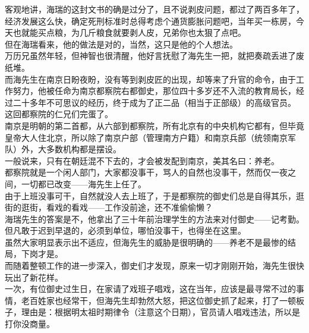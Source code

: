 \begin{multicols}{\theparacolNo}
客观地讲，海瑞的这封文书的确是过分了，且不说剥皮问题，都过了两百多年了，经济发展这么快，确定死刑标准时总得考虑个通货膨胀问题吧，当年买一栋房，今天也就能买点粮，为几斤粮食就要剥人皮，兄弟你也太狠了点吧。\\

但在海瑞看来，他的做法是对的，当然，这只是他的个人想法。\\

万历兄虽然年轻，但神智也很清醒，他好言抚慰了海先生一把，就把奏疏丢进了废纸堆。\\

而海先生在南京日盼夜盼，没有等到剥皮匠的出现，却等来了升官的命令，由于工作努力，他被任命为南京都察院右都御史，那位四十多岁还不入流的教育局长，经过二十多年不可思议的经历，终于成为了正二品（相当于正部级）的高级官员。\\

这回都察院的仁兄们完蛋了。\\

南京是明朝的第二首都，从六部到都察院，所有北京有的中央机构它都有，但毕竟皇帝大人住北京，所以除了南京户部（管理南方户籍）和南京兵部（统领南京军队）外，大多数机构都是摆设。\\

一般说来，只有在朝廷混不下去的，才会被发配到南京，美其名曰：养老。\\

都察院就是一个闲人部门，大家都没事干，骂人的自然也没事干，然而仅一夜之间，一切都已改变——海先生上任了。\\

由于上班没事可干，自然就没人去上班了，于是都察院的御史们总是自得其乐，逛街的逛街，看戏的看戏——工作没前途，还不准偷偷懒？\\

海瑞先生的答案是不，他拿出了三十年前治理学生的方法来对付御史——记考勤。但凡敢于迟到早退的，必须到单位，哪怕没事干，也得坐在这里。\\

虽然大家明显表示出不适应，但海先生的威胁是很明确的——养老不是最惨的结局，下岗才是。\\

而随着整顿工作的进一步深入，御史们才发现，原来一切才刚刚开始，海先生很快玩出了新花样。\\

一次，有位御史过生日，在家请了戏班子唱戏，这在当年，应该是最寻常不过的事情，老百姓家也经常干，但海先生却勃然大怒，把这位御史抓了起来，打了一顿板子，理由是：根据明太祖时期律令（注意这个日期），官员请人唱戏违法，所以是打你没商量。\\


\end{multicols}
